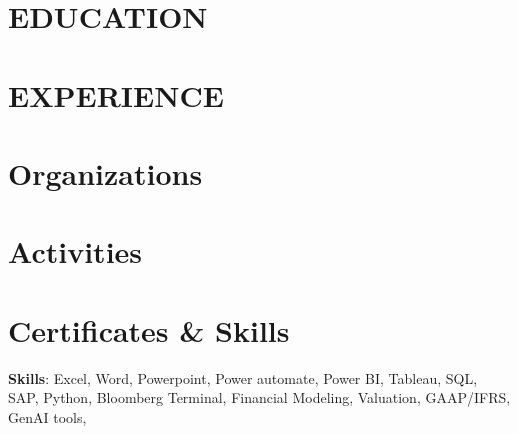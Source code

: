 \documentclass[10pt, letterpaper]{article}
\begin{document}
    \newcommand{\AND}{\unskip
        \cleaders\copy\ANDbox\hskip\wd\ANDbox
        \ignorespaces
    }
    \newsavebox\ANDbox
    \sbox\ANDbox{$|$}
    
    \begin{header}
        \normalsize
    \end{header}

    \vspace{5 pt - 0.3 cm}


\section{EDUCATION}
\vspace{0.1 cm}

\vspace{0.2 cm}
\section{EXPERIENCE}

\vspace{0.1 cm}

\vspace{0.1 cm}

\vspace{0.1 cm}

\vspace{0.2 cm}
\section{Organizations}


\section{Activities}

\vspace{0.2 cm}
\section{Certificates \& Skills}

\textbf{Skills}:
Excel, Word, Powerpoint, Power automate, Power BI, Tableau, SQL, SAP, Python, Bloomberg Terminal,
Financial Modeling, Valuation, GAAP/IFRS,
GenAI tools, 
\end{document}
